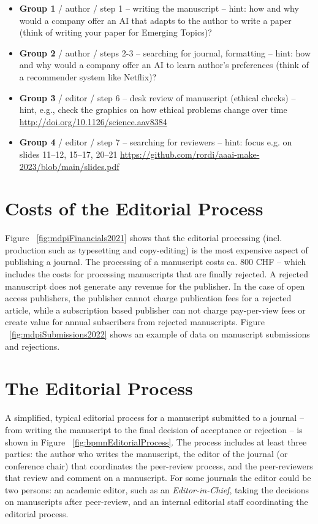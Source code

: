 \documentclass{article}
\begin{document}
\begin{itemize}
    \item \textbf{Group 1} / author / step 1 -- writing the manuscript -- hint: how and why would a company offer an AI that adapts to the author to write a paper (think of writing your paper for Emerging Topics)?
    \item \textbf{Group 2} / author / steps 2-3 -- searching for journal, formatting -- hint: how and why would a company offer an AI to learn author's preferences (think of a recommender system like Netflix)?
    \item \textbf{Group 3} / editor / step 6 -- desk review of manuscript (ethical checks) -- hint, e.g., check the graphics on how ethical problems change over time \url{http://doi.org/10.1126/science.aav8384}
    \item \textbf{Group 4} / editor / step 7 -- searching for reviewers -- hint: focus e.g. on slides 11--12, 15--17, 20--21 \url{https://github.com/rordi/aaai-make-2023/blob/main/slides.pdf}
\end{itemize}


\section{Costs of the Editorial Process}

Figure ~\ref{fig:mdpiFinancials2021} shows that the editorial processing (incl. production such as typesetting and copy-editing) is the most
expensive aspect of publishing a journal. The processing of a manuscript costs ca. 800 CHF -- which includes the costs for processing manuscripts
that are finally rejected. A rejected manuscript does not generate any revenue for the publisher. In the case of open access publishers, the 
publisher cannot charge publication fees for a rejected article, while a subscription based publisher can not charge pay-per-view fees or 
create value for annual subscribers from rejected manuscripts. Figure ~\ref{fig:mdpiSubmissions2022} shows an example of data on manuscript
submissions and rejections.

\section{The Editorial Process}

A simplified, typical editorial process for a manuscript submitted to a journal -- from writing the manuscript to the final decision of
acceptance or rejection -- is shown in Figure ~\ref{fig:bpmnEditorialProcess}. The process includes at least three parties: the author who
writes the manuscript, the editor of the journal (or conference chair) that coordinates the peer-review process, and the peer-reviewers
that review and comment on a manuscript. For some journals the editor could be two persons: an academic editor, such as an \textit{Editor-in-Chief},
taking the decisions on manuscripts after peer-review, and an internal editorial staff coordinating the editorial process.
\end{document}
